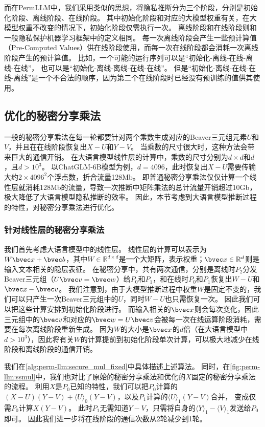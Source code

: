 %
而在PermLLM中，我们采用类似的思想，将隐私推断分为三个阶段，分别是初始化阶段、离线阶段、在线阶段。
%
其中初始化阶段和对应的大模型权重有关，在大模型权重不改变的情况下，初始化阶段仅需执行一次。
%
离线阶段和在线阶段则和一般隐私保护机器学习框架中的定义相同。
每一次离线阶段会产生一些预计算值（Pre-Computed Values）供在线阶段使用，而每一次在线阶段都会消耗一次离线阶段产生的预计算值。
%
比如，一个可能的运行序列可以是“初始化-离线-在线-离线-在线”，
也可以是“初始化-离线-离线-在线-在线”。
但是“初始化-离线-在线-在线-离线”是一个不合法的顺序，因为第二个在线阶段时已经没有预训练的值供其使用。

\subsection{优化的秘密分享乘法}
一般的秘密分享乘法在每一轮都要针对两个乘数生成对应的Beaver三元组元素$U$和$V$，并且在在线阶段恢复出$X - U$和$Y- V$。
当乘数的尺寸很大时，这种方法会带来巨大的通信开销。
%
在大语言模型线性层的计算中，乘数的尺寸分别为$d\times d$和$d$，且$d > 10^3$。
以ChatGLM-6B模型为例，$d = 4096$，此时恢复出$X - U$需要传输大约$2\times 4096^2$个浮点数，折合流量128Mb。
%
即普通秘密分享乘法仅仅计算一个线性层就消耗128Mb的流量，导致一次推断中矩阵乘法的总计流量开销超过10Gb，极大降低了大语言模型隐私推断的效率。
%
因此，本节考虑到大语言模型推断过程的特性，对秘密分享乘法进行优化。

%

\subsubsection{针对线性层的秘密分享乘法}
我们首先考虑大语言模型中的线性层。
%
线性层的计算可以表示为$W \bvec x + \bvec b$，其中$W \in \mathbb R^{d\times d}$是一个大矩阵，表示权重；$\bvec x \in \mathbb R^{d}$则是输入文本相关的隐层表征。
%
在秘密分享中，共有两次通信，分别是离线时$P_2$分发Beaver三元组（$U\bvec v = \bvec w$）给$P_0$和$P_1$，和在线时$P_0$和$P_1$恢复出$W - U$和$\bvec x - \bvec v$。
%
我们注意到，由于大模型推断过程中权重$W$是固定不变的，我们可以只产生一次Beaver三元组中的$U$，同时$W - U$也只需恢复一次。
因此我们可以把这些计算安排到初始化阶段进行。
%
而输入相关的$\bvec x$则会每次变化，因此三元组中的$\bvec v$和对应的$\bvec w=U\bvec v$会被每一次在线运算阶段消耗，需要在每次离线阶段重新生成。
%
因为$W$的大小是$\bvec x$的$d$倍（在大语言模型中$d > 10^3$），因此将有关$W$的计算提前到初始化阶段单次计算，可以极大地减少在线阶段和离线阶段的通信开销。


我们在\autoref{alg:perm-llm:secure_mul_fixed}中具体描述上述算法。
同时，在\autoref{fig:perm-llm:ssmul}中，我们也对比了原始的秘密分享乘法和优化的$X$固定的秘密分享乘法的流程。
%
利用$X$是$P_0$已知的特性，我们可以把$P_0$计算的$(X-U)(Y-V) + \langle U \rangle_0(Y-V)$，以及$P_1$计算的$\langle U \rangle_1(Y-V)$合并，
变成仅需$P_0$计算$X(Y-V)$。
%
此时$P_1$无需知道$Y-V$，只需将自身的$\langle Y \rangle_1 - \langle V \rangle_1$发送给$P_0$即可。
因此我们进一步将在线阶段的通信次数从2轮减少到1轮。
%


